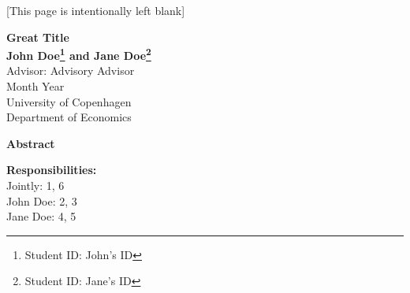 \thispagestyle{empty}
\vspace*{3 cm}
\begin{center}
    [This page is intentionally left blank]
\end{center}

\newpage
\thispagestyle{empty}
\renewcommand{\thefootnote}{\fnsymbol{footnote}}
\begin{center}\noindent \large \textbf{Great Title} \\

\normalsize \textbf{John Doe\footnote[2]{Student ID: John's ID} and Jane Doe\footnote[3]{Student ID: Jane's ID}}\\
\vspace{0.1cm}
Advisor: Advisory Advisor \\
\vspace{0.1cm}
Month Year \\
\vspace{0.1cm}
University of Copenhagen \\
Department of Economics

\vspace{1 cm}
\large \textbf{Abstract}\\
\vspace{-0.2cm}
\end{center}
\normalsize
\lipsum[1-2]



\vspace{\fill}
\footnotesize
\noindent \textbf{Responsibilities:} \\
Jointly: 1, 6\\
John Doe: 2, 3\\
Jane Doe:  4, 5\\
\vspace{1 cm}
\renewcommand{\thefootnote}{\arabic{footnote}}
\setcounter{footnote}{0}